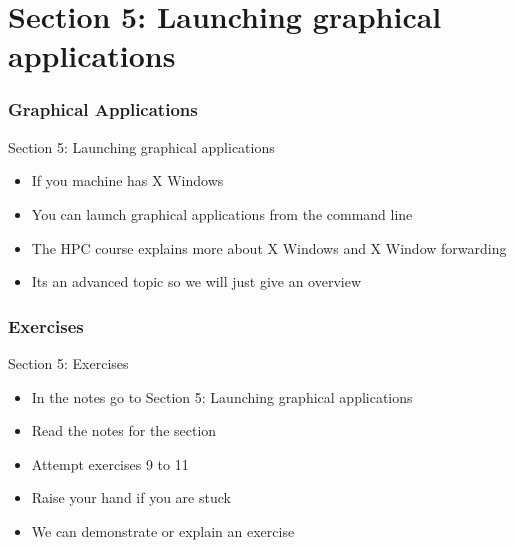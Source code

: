 \part{Section 5: Launching graphical applications}
\begin{frame}
\partpage
\end{frame}

\section{Graphical Applications}
\begin{frame}{Section 5: Launching graphical applications}
\begin{itemize}
\item If you machine has X Windows
\item You can launch graphical applications from the command line
\item The HPC course explains more about X Windows and X Window forwarding
\item Its an advanced topic so we will just give an overview
\end{itemize}
\end{frame}

\section{Exercises}
\begin{frame}{Section 5: Exercises}
\begin{itemize}
\item In the notes go to {Section 5: Launching graphical applications}
\item Read the notes for the section 
\item Attempt exercises 9 to 11
\item Raise your hand if you are stuck
\item We can demonstrate or explain an exercise
\end{itemize}
\end{frame}